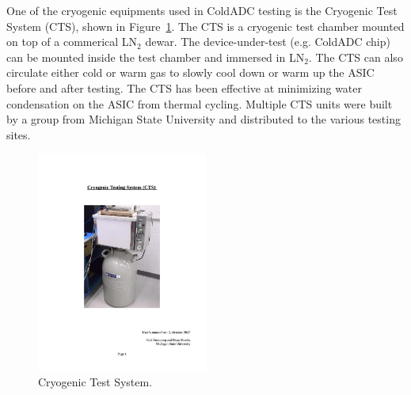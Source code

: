 \label{sec:2.1}


One of the cryogenic equipments used in ColdADC testing is the Cryogenic Test System (CTS), shown in Figure~\ref{fig:cts}. The CTS is a cryogenic test chamber mounted on top of a commerical LN$_2$ dewar. The device-under-test (e.g. ColdADC chip) can be mounted inside the test chamber and immersed in LN$_2$. The CTS can also circulate either cold or warm gas to slowly cool down or warm up the ASIC before and after testing. The CTS has been effective at minimizing water condensation on the ASIC from thermal cycling. Multiple CTS units were built by a group from Michigan State University and distributed to the various testing sites.
\begin{figure}[htb]
\centering
\begin{center}
\includegraphics[width=0.5\textwidth]{figures/CTS.pdf}
\end{center}
\caption{Cryogenic Test System.}
\label{fig:cts}
\end{figure}


